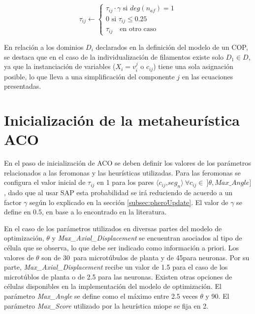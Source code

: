 \begin{equation}
    \tau_{ij} \leftarrow
        \begin{cases}
         \tau_{ij} \cdot \gamma \text{ si } deg(n_{af}) = 1  \\[3ex]
        
        \text{0 si } \tau_{ij} \leq 0.25 \\[3ex]
        \tau_{ij} \quad \text{en otro caso}
        \end{cases}
    \label{eq:antiPheroSAP_neuron}
\end{equation}


En relaci\'on a los dominios $D_i$ declarados en la definici\'on del modelo de un COP, se destaca que en el caso de la individualizaci\'on de filamentos existe solo $D_1 \in D$, ya que la instanciaci\'on de variables ($X_i = v_{i}^{j}$ o $c_{ij}$) tiene una sola asignaci\'on posible, lo que lleva a una simplificaci\'on del componente $j$ en las ecuaciones presentadas.

\section{Inicializaci\'on de la metaheur\'istica ACO}

En el paso de inicializaci\'on de ACO se deben definir los valores de los par\'ametros relacionados a las feromonas y las heur\'isticas utilizadas. Para las feromonas se configura el valor inicial de $\tau_{ij}$ en 1 para los pares $\langle c_{ij}$,$ seg_{n}\rangle \> \forall c_{ij} \in \> ]\theta, Max\_Angle]$, dado que al usar SAP esta probabilidad se ir\'a reduciendo de acuerdo a un factor $\gamma$ seg\'un lo explicado en la secci\'on \ref{subsec:pheroUpdate}. El valor de $\gamma$ se define en 0.5, en base a lo encontrado en la literatura.

En el caso de los par\'ametros utilizados en diversas partes del modelo de optimizaci\'on, $\theta$ y {\it Max\_Axial\_Displacement} se encuentran asociados al tipo de c\'elula que se observa, lo que debe ser indicado como informaci\'on a priori. Los valores de $\theta$ son de 30\textdegree ~para microt\'ubulos de planta y de 45\textdegree para neuronas. Por su parte, {\it Max\_Axial\_Displacement} recibe un valor de 1.5 para el caso de los microt\'ublos de planta o de 2.5 para las neuronas. Existen otras opciones de c\'elulas disponibles en la implementaci\'on del modelo de optimizaci\'on. El par\'ametro {\it Max\_Angle} se define como el m\'aximo entre 2.5 veces $\theta$ y 90. El par\'ametro {\it Max\_Score} utilizado por la heur\'istica miope se fija en 2.


